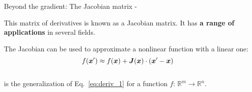 \begin{frame}[t,allowframebreaks]{
    Beyond the gradient: The Jacobian matrix -}
    \vspace{0.2cm}

    This matrix of derivatives is known as a
    \Gls{Jacobian matrix}.
    It has {\bf a range of applications} in several fields.\\

    \framebreak


    The Jacobian can be used to approximate a nonlinear 
    function with a linear one:
    \begin{equation}
        f(\boldsymbol{x}^\prime) \approx 
        f(\boldsymbol{x}) + \boldsymbol{J}(\boldsymbol{x}) \cdot (\boldsymbol{x}^\prime - \boldsymbol{x})   
        \label{eq:jacobian_linearization_1}
    \end{equation}\\
    is the generalization of Eq.~\ref{eq:deriv_1}
    for a function $f$: $\mathbb{R}^m \rightarrow \mathbb{R}^n$.


\end{frame}
